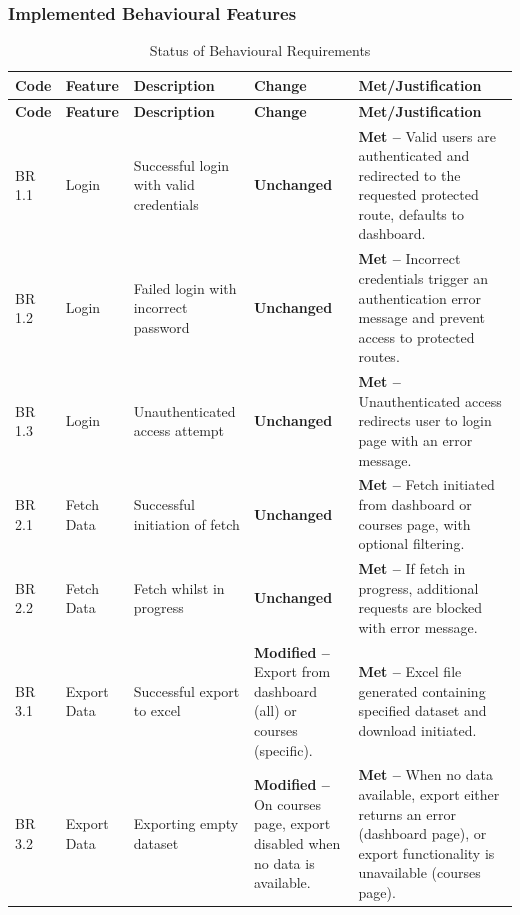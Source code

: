 \subsubsection{Implemented Behavioural Features}
\vspace{-8pt}
\setlength{\tabcolsep}{6pt}
\begin{xltabular}{\textwidth}{@{} l p{1.5cm} p{2.5cm} p{3.5cm} X @{}}
\caption{Status of Behavioural Requirements} \\
\toprule
\textbf{Code} & \textbf{Feature} &\textbf{Description} & \textbf{Change} & \textbf{Met/Justification} \\
\midrule
\endfirsthead
\toprule
\textbf{Code} & \textbf{Feature} &\textbf{Description} & \textbf{Change} & \textbf{Met/Justification} \\
\midrule
\endhead
\bottomrule
\endlastfoot

BR 1.1 & Login & Successful login with valid credentials & \textbf{Unchanged} & \textbf{Met --} Valid users are authenticated and redirected to the requested protected route, defaults to dashboard. \\
BR 1.2 & Login & Failed login with incorrect password & \textbf{Unchanged} & \textbf{Met --} Incorrect credentials trigger an authentication error message and prevent access to protected routes. \\
BR 1.3 & Login & Unauthenticated access attempt & \textbf{Unchanged} & \textbf{Met --} Unauthenticated access redirects user to login page with an error message. \\

\midrule

BR 2.1 & Fetch Data & Successful initiation of fetch & \textbf{Unchanged} & \textbf{Met --} Fetch initiated from dashboard or courses page, with optional filtering. \\

BR 2.2 & Fetch Data & Fetch whilst in progress & \textbf{Unchanged} & \textbf{Met --} If fetch in progress, additional requests are blocked with error message. \\

\midrule

BR 3.1 & Export Data & Successful export to excel & \textbf{Modified --} Export from dashboard (all) or courses (specific). & \textbf{Met --} Excel file generated containing specified dataset and download initiated. \\

BR 3.2 & Export Data & Exporting empty dataset & \textbf{Modified --} On courses page, export disabled when no data is available. & \textbf{Met --} When no data available, export either returns an error (dashboard page), or export functionality is unavailable (courses page). \\


\end{xltabular}

